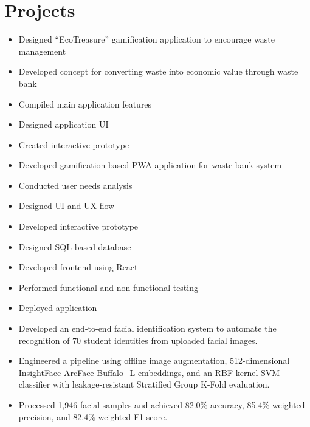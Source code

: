 \section*{Projects}

\begin{itemize}
  \item Designed ``EcoTreasure'' gamification application to encourage waste management
  \item Developed concept for converting waste into economic value through waste bank
  \item Compiled main application features
  \item Designed application UI
  \item Created interactive prototype
\end{itemize}

\begin{itemize}
  \item Developed gamification-based PWA application for waste bank system
  \item Conducted user needs analysis
  \item Designed UI and UX flow
  \item Developed interactive prototype
  \item Designed SQL-based database
  \item Developed frontend using React
  \item Performed functional and non-functional testing
  \item Deployed application
\end{itemize}

\begin{itemize}
  \item Developed an end-to-end facial identification system to automate the recognition of 70 student identities from uploaded facial images.
  \item Engineered a pipeline using offline image augmentation, 512-dimensional InsightFace ArcFace Buffalo\_L embeddings, and an RBF-kernel SVM classifier with leakage-resistant Stratified Group K-Fold evaluation.
  \item Processed 1,946 facial samples and achieved 82.0\% accuracy, 85.4\% weighted precision, and 82.4\% weighted F1-score.
\end{itemize}

